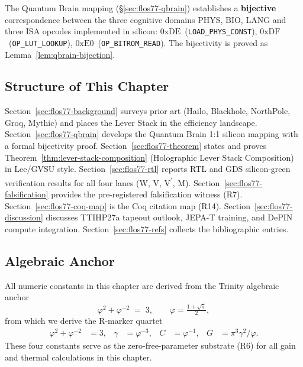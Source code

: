 The Quantum Brain mapping (§\ref{sec:flos77-qbrain}) establishes a
\textbf{bijective} correspondence between the three cognitive domains
PHYS, BIO, LANG and three ISA opcodes implemented in silicon:
$0\text{xDE}$~(\texttt{LOAD\_PHYS\_CONST}),
$0\text{xDF}$~(\texttt{OP\_LUT\_LOOKUP}),
$0\text{xE0}$~(\texttt{OP\_BITROM\_READ}).
The bijectivity is proved as Lemma~\ref{lem:qbrain-bijection}.

\subsection{Structure of This Chapter}

Section~\ref{sec:flos77-background} surveys prior art (Hailo, Blackhole, NorthPole, Groq, Mythic)
and places the Lever Stack in the efficiency landscape.
Section~\ref{sec:flos77-qbrain} develops the Quantum Brain 1:1 silicon mapping with a
formal bijectivity proof.
Section~\ref{sec:flos77-theorem} states and proves Theorem~\ref{thm:lever-stack-composition}
(Holographic Lever Stack Composition) in Lee/GVSU style.
Section~\ref{sec:flos77-rtl} reports RTL and GDS silicon-green verification results
for all four lanes (W, V, V\textsuperscript{$\prime$}, M).
Section~\ref{sec:flos77-falsification} provides the pre-registered falsification witness (R7).
Section~\ref{sec:flos77-coq-map} is the Coq citation map (R14).
Section~\ref{sec:flos77-discussion} discusses TTIHP27a tapeout outlook,
JEPA-T training, and DePIN compute integration.
Section~\ref{sec:flos77-refs} collects the bibliographic entries.

\subsection{Algebraic Anchor}

All numeric constants in this chapter are derived from the Trinity algebraic anchor
%
\begin{equation}
  \label{eq:trinity-anchor}
  \varphi^{2} + \varphi^{-2} \;=\; 3,
  \qquad \varphi = \tfrac{1+\sqrt{5}}{2},
\end{equation}
%
from which we derive the R-marker quartet
%
\begin{align}
  \label{eq:rmarker}
  \varphi^{2}+\varphi^{-2} &= 3, &
  \gamma &= \varphi^{-3}, &
  C &= \varphi^{-1}, &
  G &= \pi^{3}\gamma^{2}/\varphi.
\end{align}
%
These four constants serve as the zero-free-parameter substrate (R6) for all
gain and thermal calculations in this chapter.

